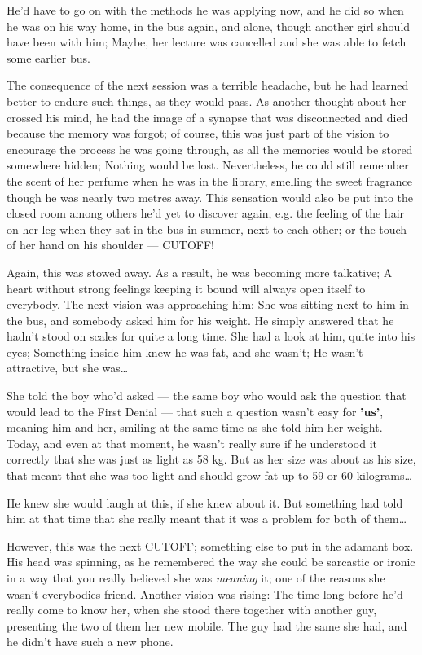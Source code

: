 He'd have to go on with the methods he was applying now, and he did so when he was on his way home, in the bus again, and alone, though another girl should have been with him; Maybe, her lecture was cancelled and she was able to fetch some earlier bus.

The consequence of the next session was a terrible headache, but he had learned better to endure such things, as they would pass. 
As another thought about her crossed his mind, he had the image of a synapse that was disconnected and died because the memory was forgot; of course, this was just part of the vision to encourage the process he was going through, as all the memories would be stored somewhere hidden; Nothing would be lost. 
Nevertheless, he could still remember the scent of her perfume when he was in the library, smelling the sweet fragrance though he was nearly two metres away. 
This sensation would also be put into the closed room among others he'd yet to discover again, e.g. the feeling of the hair on her leg when they sat in the bus in summer, next to each other; or the touch of her hand on his shoulder --- CUTOFF!

Again, this was stowed away. 
As a result, he was becoming more talkative; A heart without strong feelings keeping it bound will always open itself to everybody. 
The next vision was approaching him: She was sitting next to him in the bus, and somebody asked him for his weight. He simply answered that he hadn't stood on scales for quite a long time. She had a look at him, quite into his eyes; Something inside him knew he was fat, and she wasn't; He wasn't attractive, but she was\dots{}

She told the boy who'd asked --- the same boy who would ask the question that would lead to the First Denial --- that such a question wasn't easy for \textbf{'us'}, meaning him and her, smiling at the same time as she told him her weight. Today, and even at that moment, he wasn't really sure if he understood it correctly that she was just as light as 58 kg. But as her size was about as his size, that meant that she was too light and should grow fat up to 59 or 60 kilograms\dots{}

He knew she would laugh at this, if she knew about it. But something had told him at that time that she really meant that it was a problem for both of them\dots{}

However, this was the next CUTOFF; something else to put in the adamant box. 
His head was spinning, as he remembered the way she could be sarcastic or ironic in a way that you really believed she was \emph{meaning} it; one of the reasons she wasn't everybodies friend. 
Another vision was rising: The time long before he'd really come to know her, when she stood there together with another guy, presenting the two of them her new mobile. The guy had the same she had, and he didn't have such a new phone.

